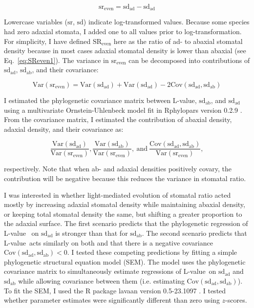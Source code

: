 \documentclass[12pt, oneside]{article}
\newcommand{\pkg}[1]{{\fontseries{b}\selectfont #1}}
\newcommand{\el}{L-value}
\begin{document}
\begin{equation} \label{eq:SReven3} 
  \mathrm{sr_{even}} = \mathrm{sd_{ad}} - \mathrm{sd_{ad}}
\end{equation}

Lowercase variables ($\mathrm{sr}$, $\mathrm{sd}$) indicate log-transformed values. Because some species had zero adaxial stomata, I added one to all values prior to log-transformation. For simplicity, I have defined $\mathrm{SR_{even}}$ here as the ratio of ad- to abaxial stomatal density because in most cases adaxial stomatal density is lower than abaxial (see Eq.~\ref{eq:SReven1}). The variance in $\mathrm{sr_{even}}$ can be decomposed into contributions of $\mathrm{sd_{ad}}$, $\mathrm{sd_{ab}}$, and their covariance:

\begin{equation} \label{eq:varDecomp}
	\mathrm{Var(sr_{even})} = \mathrm{Var(sd_{ad})} + \mathrm{Var(sd_{ad})} - 2 \mathrm{Cov(sd_{ad}, sd_{ab})}
\end{equation}

I estimated the phylogenetic covariance matrix between \el, $\mathrm{sd_{ab}}$, and $\mathrm{sd_{ad}}$ using a multivariate Ornstein-Uhlenbeck model fit in \pkg{Rphylopars} version 0.2.9 \citep{Goolsby_etal_2016, Goolsby_etal_2017}. From the covariance matrix, I estimated the contribution of abaxial density, adaxial density, and their covariance as:

\begin{equation} \label{eq:contribution}
	\frac{\mathrm{Var(sd_{ad})}}{\mathrm{Var(sr_{even})}}, \frac{\mathrm{Var(sd_{ab})}}{\mathrm{Var(sr_{even})}},~\textrm{and}~\frac{\mathrm{Cov(sd_{ad}, sd_{ab})}}{\mathrm{Var(sr_{even})}},
\end{equation}

respectively. Note that when ab- and adaxial densities positively covary, the contribution will be negative because this reduces the variance in stomatal ratio.

I was interested in whether light-mediated evolution of stomatal ratio acted mostly by increasing adaxial stomatal density while maintaining abaxial density, or keeping total stomatal density the same, but shifting a greater proportion to the adaxial surface. The first scenario predicts that the phylogenetic regression of \el~ on $\mathrm{sd_{ad}}$ is stronger than that for $\mathrm{sd_{ab}}$. The second scenario predicts that \el~acts similarly on both and that there is a negative covariance $\mathrm{Cov(sd_{ad}, sd_{ab}) < 0}$. I tested these competing predictions by fitting a simple phylogenetic structural equation model (SEM). The model uses the phylogenetic covariance matrix to simultaneously estimate regressions of \el~on $\mathrm{sd_{ad}}$ and $\mathrm{sd_{ab}}$ while allowing covariance between them (i.e. estimating $\mathrm{Cov(sd_{ad}, sd_{ab})}$). To fit the SEM, I used the R package \pkg{lavaan} version 0.5-23.1097 \citep{Rosseel_2012}. I tested whether parameter estimates were significantly different than zero using $z$-scores.
\end{document}
